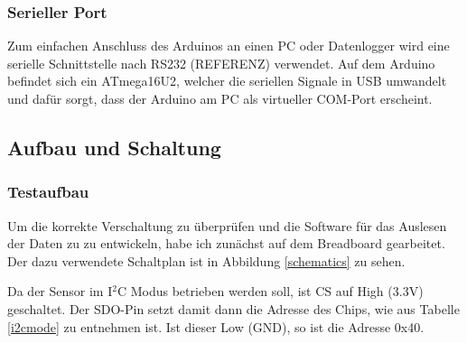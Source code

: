 \documentclass[12pt,a4paper]{scrartcl}
\begin{document}
\subsubsection{Serieller Port}
Zum einfachen Anschluss des Arduinos an einen PC oder Datenlogger wird eine serielle Schnittstelle nach RS232 (REFERENZ) verwendet. Auf dem Arduino befindet sich ein ATmega16U2, welcher die seriellen Signale in USB umwandelt und dafür sorgt, dass der Arduino am PC als virtueller COM-Port erscheint.

\newpage
\subsection{Aufbau und Schaltung}

\subsubsection{Testaufbau}

Um die korrekte Verschaltung zu überprüfen und die Software für das Auslesen der Daten zu zu entwickeln, habe ich zunächst auf dem Breadboard gearbeitet. Der dazu verwendete Schaltplan ist in Abbildung \ref{schematics} zu sehen.

Da der Sensor im I$^2$C Modus betrieben werden soll, ist CS auf High (3.3V) geschaltet. Der SDO-Pin setzt damit dann die Adresse des Chips, wie aus Tabelle \ref{i2cmode} zu entnehmen ist. Ist dieser Low (GND), so ist die Adresse 0x40.



\begin{figure}[h]
\centering

\end{figure}
\end{document}
